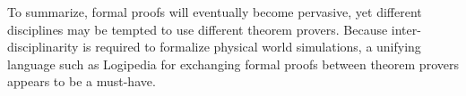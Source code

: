 To summarize, formal proofs will eventually become pervasive, yet
different disciplines may be tempted to use different theorem provers.
Because inter-disciplinarity is required to formalize physical world simulations,
a unifying language such as {\sf Logipedia} for exchanging formal proofs between
theorem provers appears to be a must-have.



